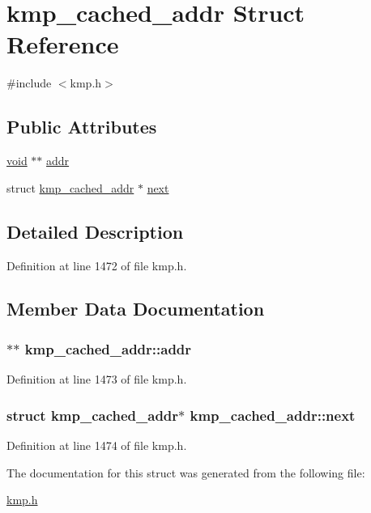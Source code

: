 \hypertarget{structkmp__cached__addr}{\section{kmp\-\_\-cached\-\_\-addr Struct Reference}
\label{structkmp__cached__addr}
}


{\ttfamily \#include $<$kmp.\-h$>$}

\subsection*{Public Attributes}
\begin{DoxyCompactItemize}
\item 
\hyperlink{ittnotify__static_8h_af941d56e55e3c5465135b60c4d6343ed}{void} $\ast$$\ast$ \hyperlink{structkmp__cached__addr_affbc380f12d77a61086ae4dc40256b09}{addr}
\item 
struct \hyperlink{structkmp__cached__addr}{kmp\-\_\-cached\-\_\-addr} $\ast$ \hyperlink{structkmp__cached__addr_ae41b7057e025555848a335dca0ce1788}{next}
\end{DoxyCompactItemize}


\subsection{Detailed Description}


Definition at line 1472 of file kmp.\-h.



\subsection{Member Data Documentation}
\hypertarget{structkmp__cached__addr_affbc380f12d77a61086ae4dc40256b09}{
\subsubsection[{addr}]{$\ast$$\ast$ kmp\-\_\-cached\-\_\-addr\-::addr}}\label{structkmp__cached__addr_affbc380f12d77a61086ae4dc40256b09}


Definition at line 1473 of file kmp.\-h.

\hypertarget{structkmp__cached__addr_ae41b7057e025555848a335dca0ce1788}{
\subsubsection[{next}]{\setlength{\rightskip}{0pt plus 5cm}struct {\bf kmp\-\_\-cached\-\_\-addr}$\ast$ kmp\-\_\-cached\-\_\-addr\-::next}}\label{structkmp__cached__addr_ae41b7057e025555848a335dca0ce1788}


Definition at line 1474 of file kmp.\-h.



The documentation for this struct was generated from the following file\-:\begin{DoxyCompactItemize}
\item 
\hyperlink{kmp_8h}{kmp.\-h}\end{DoxyCompactItemize}
